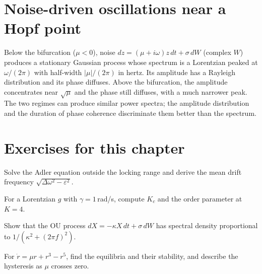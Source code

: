 \section{Noise-driven oscillations near a Hopf point}
Below the bifurcation ($\mu<0$), noise $dz=(\mu+i\omega)z\,dt+\sigma\,dW$
(complex $W$) produces a stationary Gaussian process whose spectrum is a
Lorentzian peaked at $\omega/(2\pi)$ with half-width $|\mu|/(2\pi)$ in
hertz. Its amplitude has a Rayleigh distribution and its phase diffuses.
Above the bifurcation, the amplitude concentrates near $\sqrt\mu$ and the
phase still diffuses, with a much narrower peak. The two regimes can
produce similar power spectra; the amplitude distribution and the
duration of phase coherence discriminate them better than the spectrum.

\section*{Exercises for this chapter}
\begin{exercise}
Solve the Adler equation outside the locking range and derive the mean
drift frequency $\sqrt{\Delta\omega^2-\varepsilon^2}$.
\end{exercise}
\begin{exercise}
For a Lorentzian $g$ with $\gamma=1$\,rad/s, compute $K_c$ and the order
parameter at $K=4$.
\end{exercise}
\begin{exercise}
Show that the OU process $dX=-\kappa X\,dt+\sigma\,dW$ has spectral
density proportional to $1/(\kappa^2+(2\pi f)^2)$.
\end{exercise}
\begin{exercise}
For $\dot r=\mu r+r^3-r^5$, find the equilibria and their stability, and
describe the hysteresis as $\mu$ crosses zero.
\end{exercise}
